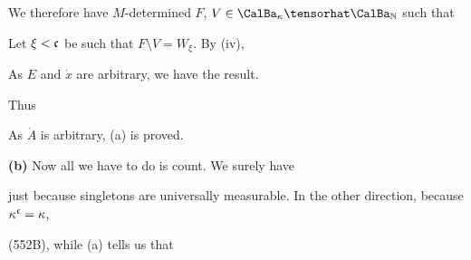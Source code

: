 {

\noindent We therefore have $M$-determined $F$,
$V\in\CalBa_{\kappa}\tensorhat\CalBa_{\Bbb N}$ such that


\noindent Let $\xi<\frak c$ be such that $F\setminus V=W_{\xi}$.
By (iv),


\noindent
As $E$ and $\dot x$ are arbitrary, we have the result.\ \Qed

Thus


\noindent As $\dot A$ is arbitrary, (a) is proved.

\medskip

{\bf (b)} Now all we have to do is count.   We surely have


\noindent just because singletons are universally measurable.   In the
other direction, because $\kappa^{\frak c}=\kappa$,


\noindent (552B), while (a) tells us that

}%

